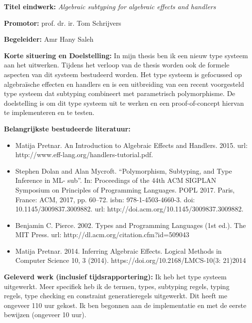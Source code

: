 \documentclass[12pt]{report}
\begin{document}
\pagestyle{myheadings}
{\bf Titel eindwerk:} {\em Algebraic subtyping for algebraic effects and handlers}

\vspace{0.5cm}
{\bf Promotor:} prof. dr. ir. Tom Schrijvers


\vspace{0.5cm}
{\bf Begeleider:} Amr Hany Saleh

\vspace{1cm}
{\bf Korte situering en Doelstelling:} In mijn thesis ben ik een nieuw type systeem aan het uitwerken. Tijdens het verloop van de thesis worden ook de formele aspecten van dit systeem bestudeerd worden. Het type systeem is gefocussed op algebraïsche effecten en handlers en is een uitbreiding van een recent voorgesteld type systeem dat subtyping combineert met parametrisch polymorphisme. De doelstelling is om dit type systeem uit te werken en een proof-of-concept hiervan te implementeren en te testen.

\vspace{1cm}
{\bf Belangrijkste bestudeerde literatuur:}
\begin{itemize}
\item Matija Pretnar. An Introduction to Algebraic Effects and Handlers. 2015. url: http://www.eff-lang.org/handlers-tutorial.pdf.
\item Stephen Dolan and Alan Mycroft. “Polymorphism, Subtyping, and Type Inference in ML- sub”. In: Proceedings of the 44th ACM SIGPLAN Symposium on Principles of Programming Languages. POPL 2017. Paris, France: ACM, 2017, pp. 60–72. isbn: 978-1-4503-4660-3. doi: 10.1145/3009837.3009882. url: http://doi.acm.org/10.1145/3009837.3009882.
\item Benjamin C. Pierce. 2002. Types and Programming Languages (1st ed.). The MIT Press. url: http://dl.acm.org/citation.cfm?id=509043
\item Matija Pretnar. 2014. Inferring Algebraic Effects. Logical Methods in Computer Science 10, 3 (2014). https://doi.org/10.2168/LMCS-10(3: 21)2014
\end{itemize}

\vspace{1cm}
{\bf Geleverd werk (inclusief tijdsrapportering):} Ik heb het type systeem uitgewerkt. Meer specifiek heb ik de termen, types, subtyping regels, typing regels, type checking en constraint generatieregels uitgewerkt. Dit heeft me ongeveer 110 uur gekost. Ik ben begonnen aan de implementatie en met de eerste bewijzen (ongeveer 10 uur). 
\end{document}
